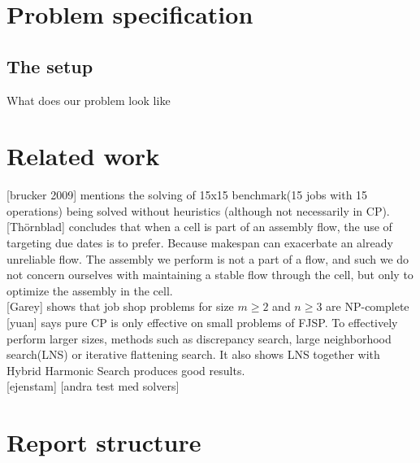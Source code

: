 \section{Problem specification}
\subsection{The setup}
What does our problem look like

\section{Related work}
[brucker 2009] mentions the solving of 15x15 benchmark(15 jobs with 15 operations) being solved without heuristics (although not necessarily in CP).\cite{brucker_2009}
\\

[Thörnblad] concludes that when a cell is part of an assembly flow, the use of targeting due dates is to prefer. Because makespan can exacerbate an already unreliable flow. The assembly we perform is not a part of a flow, and such we do not concern ourselves with maintaining a stable flow through the cell, but only to optimize the assembly in the cell.\cite{thornblad_2013}
\\

[Garey] shows that job shop problems for size $m \geq 2$ and $n \geq 3$ are NP-complete \cite{garey_1976}
\\

[yuan] says pure CP is only effective on small problems of FJSP. To effectively perform larger sizes, methods such as discrepancy search, large neighborhood search(LNS) or iterative flattening search. It also shows LNS together with Hybrid Harmonic Search produces good results.\cite{yuan_2013}
\\

[ejenstam]
[andra test med solvers]

\section{Report structure}

